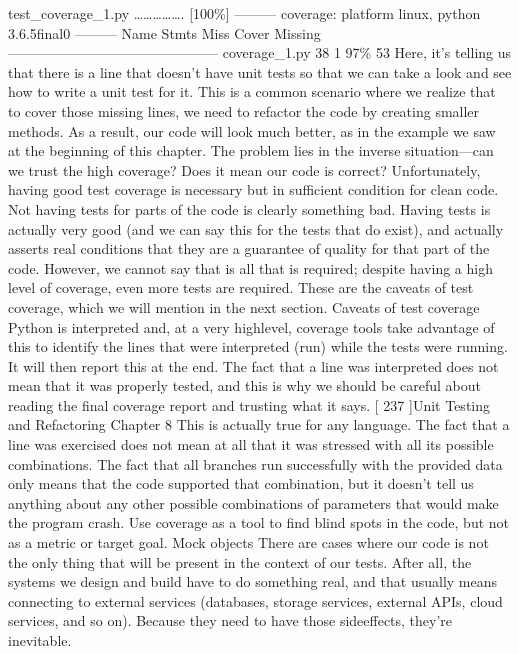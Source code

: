 \documentclass[a4paper,10pt,english]{sphinxmanual}
\begin{document}
test\_coverage\_1.py ……………. {[}100\%{]}
———\textendash{} coverage: platform linux, python 3.6.5\sphinxhyphen{}final\sphinxhyphen{}0 ———\textendash{}
Name
Stmts Miss Cover Missing
———————————————
coverage\_1.py 38
1 97\%
53
Here, it’s telling us that there is a line that doesn’t have unit tests so that we can take a look
and see how to write a unit test for it. This is a common scenario where we realize that to
cover those missing lines, we need to refactor the code by creating smaller methods. As a
result, our code will look much better, as in the example we saw at the beginning of this
chapter.
The problem lies in the inverse situation—can we trust the high coverage? Does it mean our
code is correct? Unfortunately, having good test coverage is necessary but in sufficient
condition for clean code. Not having tests for parts of the code is clearly something bad.
Having tests is actually very good (and we can say this for the tests that do exist), and
actually asserts real conditions that they are a guarantee of quality for that part of the code.
However, we cannot say that is all that is required; despite having a high level of coverage,
even more tests are required.
These are the caveats of test coverage, which we will mention in the next section.
Caveats of test coverage
Python is interpreted and, at a very high\sphinxhyphen{}level, coverage tools take advantage of this to
identify the lines that were interpreted (run) while the tests were running. It will then
report this at the end. The fact that a line was interpreted does not mean that it was
properly tested, and this is why we should be careful about reading the final coverage
report and trusting what it says.
{[} 237 {]}Unit Testing and Refactoring
Chapter 8
This is actually true for any language. The fact that a line was exercised does not mean at all
that it was stressed with all its possible combinations. The fact that all branches run
successfully with the provided data only means that the code supported that combination,
but it doesn’t tell us anything about any other possible combinations of parameters that
would make the program crash.
Use coverage as a tool to find blind spots in the code, but not as a metric
or target goal.
Mock objects
There are cases where our code is not the only thing that will be present in the context of
our tests. After all, the systems we design and build have to do something real, and that
usually means connecting to external services (databases, storage services, external APIs,
cloud services, and so on). Because they need to have those side\sphinxhyphen{}effects, they’re inevitable.
\end{document}
